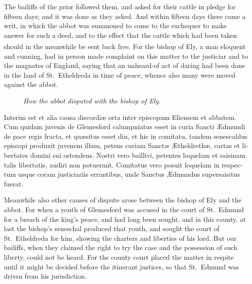 \documentclass[10pt]{book}
\newcounter{engnote}
\newcommand{\engnotenum}{\textsuperscript{\arabic{engnote}\stepcounter{engnote}}}
\newcommand{\blockhead}[4][]{
\begin{figure}
\centering
\vspace{#4}
\parbox{2.75cm}{\begin{center}\footnotesize \color{BrickRed} \emph{#2}\\ #1 \end{center}}
\end{figure}
}
\begin{document}
\begin{paracol}{2}
\switchcolumn

The bailiffs of the prior followed them, and asked for their cattle in pledge for fifteen days; and it was done as they asked. And within fifteen days there came a writ, in which the abbot was summoned to come to the exchequer to make answer for such a deed, and to the effect that the cattle which had been taken should in the meanwhile be sent back free. For the bishop of Ely,\engnotenum{} a man eloquent and cunning, had in person made complaint on this matter to the justiciar and to the magnates of England, saying that an unheard-of act of daring had been done in the land of St.\ Etheldreda in time of peace, whence also many were moved against the abbot.

\switchcolumn*

\begin{otherlanguage}{latin}
\blockhead{How the abbot disputed with the bishop of Ely.}{3}{-.55cm}
Interim est et alia causa discordi\ae{} orta inter episcopum Eliensem et abbatem. Cum quidam juvenis de Glemesford calumpniatus esset in curia Sancti \AE{}dmundi de pace regis fracta, et qu\ae{}situs esset diu, et hie in comitatu, tandem senescaldus episcopi produxit juvenem illum, petens curiam Sanct\ae{} \AE{}theldreth\ae{}, cartas et libertates domini sui ostendens. Nostri vero baillivi, petentes loquelam et saisinam talis libertatis, audiri non potuerunt. Comitatus vero posuit loquelam in respectum usque coram justiciariis errantibus, unde Sanctus \AE{}dmundus supersaisitus fuerat.

\end{otherlanguage}

\switchcolumn

Meanwhile also other causes of dispute arose between the bishop of Ely and the abbot. For when a youth of Glemesford was accused in the court of St.\ Edmund for a breach of the king's peace, and had long been sought, and in this county, at last the bishop's seneschal produced that youth, and sought the court of St.\ Etheldreda for him, showing the charters and liberties of his lord. But our bailiffs, when they claimed the right to try the case and the possession of such liberty, could not be heard. For the county court placed the matter in respite until it might be decided before the itinerant justices, so that St.\ Edmund was driven from his jurisdiction.

\switchcolumn*


\end{paracol}
\end{document}
